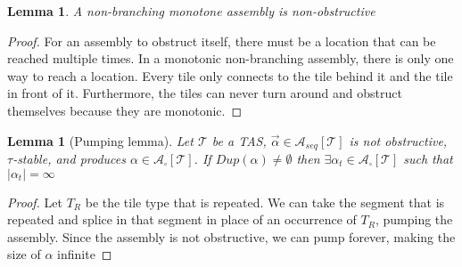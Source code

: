 \documentclass[12pt]{article}
\newtheorem{lemma}[theorem]{Lemma}
\newcommand{\tTerm}{\mathcal{A}_\square[\mathcal{T}]}
\newcommand{\tSeq}{\mathcal{A}_{seq}[\mathcal{T}]}
\newcommand{\aSeq}{\overrightarrow{\alpha}}
\begin{document}
%

\begin{lemma}
    A non-branching monotone assembly is non-obstructive
\end{lemma}

\begin{proof}
    For an assembly to obstruct itself, there must be a location that can be reached multiple times. In a monotonic non-branching assembly, there is only one way to reach a location. Every tile only connects to the tile behind it and the tile in front of it. Furthermore, the tiles can never turn around and obstruct themselves because they are monotonic.
\end{proof}


\begin{lemma}[Pumping lemma]
    Let $\mathcal{T}$ be a TAS, $\aSeq \in \tSeq$ is not obstructive, $\tau$-stable, and produces $\alpha \in \tTerm$. If $Dup(\alpha) \ne \emptyset$ then $\exists \alpha_t \in \tTerm$ such that $|\alpha_t| = \infty$
\end{lemma}
\begin{proof}
    Let $T_R$ be the tile type that is repeated. We can take the segment that is repeated and splice in that segment in place of an occurrence of $T_R$, pumping the assembly. Since the assembly is not obstructive, we can pump forever, making the size of $\alpha$ infinite 
\end{proof}


%
%
%
\end{document}
